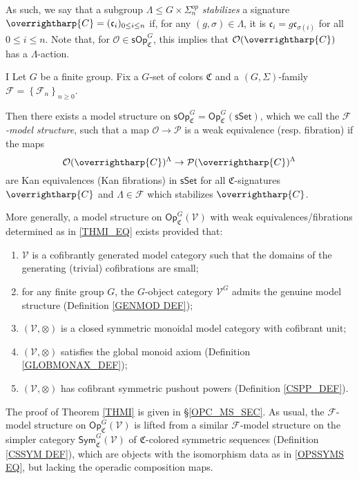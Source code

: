 \documentclass[a4paper,10pt
,draft
]{article}%
\numberwithin{equation}{section}
\numberwithin{figure}{section}
\theoremstyle{definition} %
\newcommand{\set}[1]{\left\{#1\right\}}%
\newcommand{\vect}[1]{\text{\overrightharp{\ensuremath{#1}}}}
\newcommand{\Op}{\mathsf{Op}}%
\newcommand{\F}{\ensuremath{\mathcal F}}
\newcommand{\V}{\ensuremath{\mathcal V}}
\renewcommand{\O}{\ensuremath{\mathcal O}}
\newcommand{\1}{\ensuremath{\mathbbm 1}}%
\begin{document}
As such, we say that a subgroup 
$\Lambda \leq G \times \Sigma_n^{op}$
\emph{stabilizes} a signature $\vect{C}=(\mathfrak{c}_i)_{0 \leq i \leq n}$ if,
for any $(g,\sigma) \in \Lambda$,
it is 
$\mathfrak{c}_i = g \mathfrak{c}_{\sigma(i)}$ for all $0 \leq i \leq n$.
Note that,
for $\O \in \mathsf{sOp}^G_{\mathfrak{C}}$,
this implies that $\O(\vect{C})$ has a $\Lambda$-action.




\begin{customthm}{I}\label{THMI}
Let $G$ be a finite group. Fix a $G$-set of colors $\mathfrak{C}$
and a $(G,\Sigma)$-family $\F = \set{\F_n}_{n \geq 0}$.

Then there exists a model structure on
$\mathsf{sOp}^G_{\mathfrak{C}} = 
\mathsf{Op}^G_{\mathfrak{C}}(\mathsf{sSet})$,
which we call the \emph{$\mathcal{F}$-model structure},
such that a map
$\mathcal{O} \to \mathcal{P}$
is a weak equivalence (resp. fibration) if the maps
\begin{equation}\label{THMI_EQ}
	\O(\vect{C})^{\Lambda} \to \mathcal{P}(\vect{C})^{\Lambda}
\end{equation}
are Kan equivalences (Kan fibrations)
in $\mathsf{sSet}$
for all $\mathfrak{C}$-signatures $\vect{C}$
and $\Lambda \in \F$ which stabilizes $\vect{C}$.

More generally, a model structure on 
$\Op^G_{\mathfrak C}(\V)$
with weak equivalences/fibrations determined as in 
\eqref{THMI_EQ}
exists provided that:
\begin{enumerate}[label = (\roman*)]
	\item $\V$ is a cofibrantly generated model category
	such that the domains of the generating (trivial) cofibrations are small;
	\item for any finite group $G$, the $G$-object category $\V^G$ admits the genuine model structure (Definition \ref{GENMOD DEF});
	\item $(\V, \otimes)$ is a closed symmetric monoidal model category with cofibrant unit;
	\item $(\V, \otimes)$ satisfies the global monoid axiom (Definition \ref{GLOBMONAX_DEF});
	\item $(\V, \otimes)$ has cofibrant symmetric pushout powers (Definition \ref{CSPP_DEF}).
\end{enumerate}
\end{customthm}


The proof of Theorem \ref{THMI} is given in \S \ref{OPC_MS_SEC}.
As usual, the $\F$-model structure on 
$\Op^G_{\mathfrak C}(\V)$ is lifted from 
a similar $\F$-model structure on the simpler category
$\mathsf{Sym}^G_{\mathfrak C}(\V)$
of $\mathfrak{C}$-colored symmetric sequences
(Definition \ref{CSSYM DEF}),
which are objects with the isomorphism data as in 
\eqref{OPSSYMS EQ}, 
but lacking the operadic composition maps.
\end{document}
